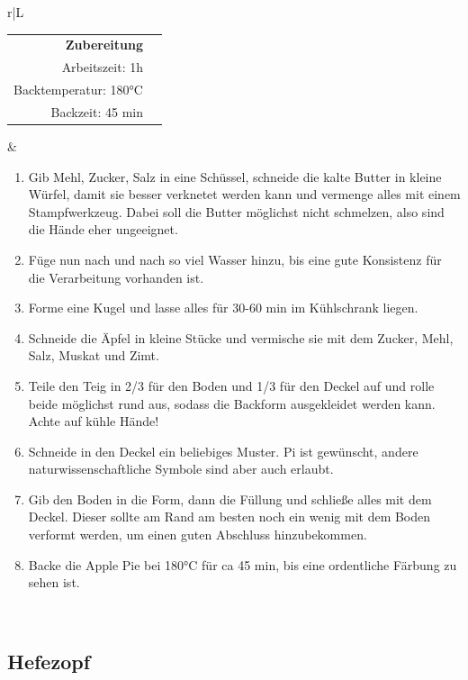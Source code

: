\documentclass[a4paper, 12pt]{scrbook} 								%
\numberwithin{equation}{section} 									%
\begin{document}
		\begin{tabularx}{\textwidth}{r|L}
			\begin{tabular}[t]{rr}
				\textbf{Zubereitung}	\\
				Arbeitszeit: 1h	\\
				Backtemperatur: 180°C \\
				Backzeit: 45 min \\
			\end{tabular}			&	\begin{enumerate}[]
											\item Gib Mehl, Zucker, Salz in eine Schüssel, schneide die kalte Butter in kleine Würfel, damit sie besser verknetet werden kann und vermenge alles mit einem Stampfwerkzeug. Dabei soll die Butter möglichst nicht schmelzen, also sind die Hände eher ungeeignet.
											\item Füge nun nach und nach so viel Wasser hinzu, bis eine gute Konsistenz für die Verarbeitung vorhanden ist.
											\item Forme eine Kugel und lasse alles für 30-60 min im Kühlschrank liegen.
											\item Schneide die Äpfel in kleine Stücke und vermische sie mit dem Zucker, Mehl, Salz, Muskat und Zimt.
											\item Teile den Teig in 2/3 für den Boden und 1/3 für den Deckel auf und rolle beide möglichst rund aus, sodass die Backform ausgekleidet werden kann. Achte auf kühle Hände!
											\item Schneide in den Deckel ein beliebiges Muster. Pi ist gewünscht, andere naturwissenschaftliche Symbole sind aber auch erlaubt.
											\item Gib den Boden in die Form, dann die Füllung und schließe alles mit dem Deckel. Dieser sollte am Rand am besten noch ein wenig mit dem Boden verformt werden, um einen guten Abschluss hinzubekommen.
											\item Backe die Apple Pie bei 180°C für ca 45 min, bis eine ordentliche Färbung zu sehen ist. 
										\end{enumerate}	\\
		\end{tabularx}
		\newpage


		\subsection{Hefezopf}	\label{Hefezopf}
\end{document}
